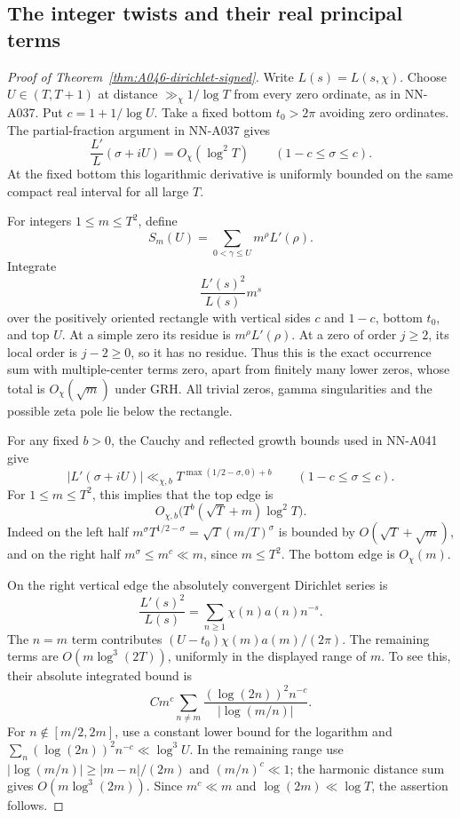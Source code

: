 \subsection{The integer twists and their real principal terms}

\begin{proof}[Proof of Theorem~\ref{thm:A046-dirichlet-signed}]
Write \(L(s)=L(s,\chi)\).
Choose \(U\in(T,T+1)\) at distance
\(\gg_\chi1/\log T\) from every zero ordinate, as in
NN-A037. Put \(c=1+1/\log U\). Take a fixed bottom
\(t_0>2\pi\) avoiding zero ordinates.
The partial-fraction argument in NN-A037 gives
\[
       \frac{L'}L(\sigma+iU)=O_\chi(\log^2T)
                       \qquad(1-c\le\sigma\le c).
\]
At the fixed bottom this logarithmic derivative is uniformly
bounded on the same compact real interval for all large \(T\).

For integers \(1\le m\le T^2\), define
\[
                  S_m(U)=\sum_{0<\gamma\le U}m^\rho L'(\rho).
\]
Integrate
\[
                   \frac{L'(s)^2}{L(s)}m^s
\]
over the positively oriented rectangle with vertical sides
\(c\) and \(1-c\), bottom \(t_0\), and top \(U\).
At a simple zero its residue is \(m^\rho L'(\rho)\).
At a zero of order \(j\ge2\), its local order is \(j-2\ge0\),
so it has no residue. Thus this is the exact occurrence sum
with multiple-center terms zero, apart from finitely many
lower zeros, whose total is \(O_\chi(\sqrt m)\) under GRH.
All trivial zeros, gamma singularities and the possible zeta
pole lie below the rectangle.

For any fixed \(b>0\), the Cauchy and reflected growth bounds
used in NN-A041 give
\[
                 |L'(\sigma+iU)|
          \ll_{\chi,b} T^{\max(1/2-\sigma,0)+b}
                          \qquad(1-c\le\sigma\le c).
\]
For \(1\le m\le T^2\), this implies that the top edge is
\[
               O_{\chi,b}\bigl(T^b(\sqrt T+m)\log^2T\bigr).
\]
Indeed on the left half
 \(m^\sigma T^{1/2-\sigma}
   =\sqrt T(m/T)^\sigma\)
is bounded by \(O(\sqrt T+\sqrt m)\), and on the right
half \(m^\sigma\le m^c\ll m\), since \(m\le T^2\).
The bottom edge is \(O_\chi(m)\).

On the right vertical edge the absolutely convergent
Dirichlet series is
\[
                  \frac{L'(s)^2}{L(s)}
                        =\sum_{n\ge1}\chi(n)a(n)n^{-s}.
\]
The \(n=m\) term contributes
\((U-t_0)\chi(m)a(m)/(2\pi)\).
The remaining terms are \(O(m\log^3(2T))\), uniformly in
the displayed range of \(m\). To see this, their absolute
integrated bound is
\[
   C m^c\sum_{n\ne m}
               \frac{(\log(2n))^2 n^{-c}}{|\log(m/n)|}.
\]
For \(n\notin[m/2,2m]\), use a constant lower bound for
the logarithm and
\(\sum_n(\log(2n))^2n^{-c}\ll\log^3U\).
In the remaining range use
\(|\log(m/n)|\ge |m-n|/(2m)\) and
\((m/n)^c\ll1\); the harmonic distance sum gives
\(O(m\log^3(2m))\). Since \(m^c\ll m\) and
\(\log(2m)\ll\log T\), the assertion follows.


\end{proof}
